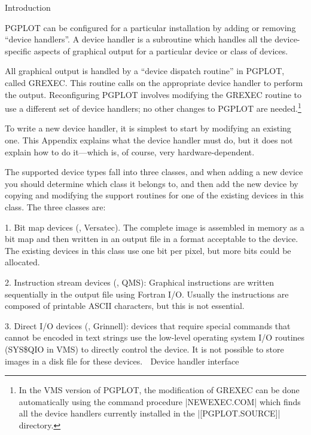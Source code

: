 

\beginsection Introduction

PGPLOT can be configured for a particular installation by adding or
removing ``device handlers''.  A device handler is a subroutine which
handles all the device-specific aspects of graphical output for a 
particular device or class of devices.

All graphical output is handled by a ``device dispatch routine'' in 
PGPLOT, called GREXEC.  This routine calls on the appropriate device 
handler to perform the output.  Reconfiguring PGPLOT involves modifying 
the GREXEC routine to use a different set of device handlers; no other 
changes to PGPLOT are needed.\footnote*{In the VMS version of PGPLOT,
the modification of GREXEC can be done automatically using the command 
procedure |NEWEXEC.COM| which finds all the device handlers currently
installed in the |[PGPLOT.SOURCE]| directory.}

To write a new device handler, it is simplest to start by modifying an 
existing one.  This Appendix explains what the device handler must do, 
but it does not explain how to do it---which is, of course, very 
hardware-dependent.

The supported device types fall into three classes, and when adding a 
new device you should determine which class it belongs to, and then 
add the new device by copying and modifying the support routines for 
one of the existing devices in this class. The three classes are:
\smallskip
\item{1.} Bit map devices (\eg, Versatec). The complete image is 
assembled in memory as a bit map and then written in an output file in
a format acceptable to the device. The existing devices in this class
use one bit per pixel, but more bits could be allocated.
\item{2.} Instruction stream devices (\eg, QMS): Graphical instructions
are written sequentially in the output file using Fortran I/O. Usually 
the instructions are composed of printable ASCII characters, but this is
not essential.
\item{3.} Direct I/O devices (\eg, Grinnell): devices that require 
special commands that cannot be encoded in text strings use the 
low-level operating system I/O routines (SYS\$QIO in VMS) to directly
control the device. It is not possible to store images in a disk file
for these devices. 

\beginsection Device handler interface
     
